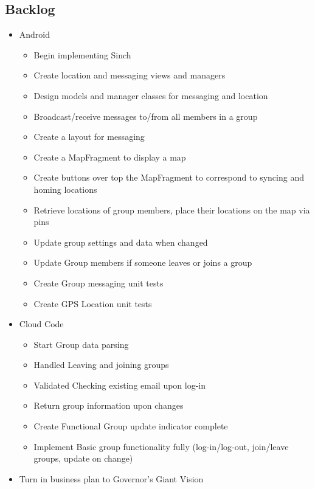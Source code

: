 \subsection{Backlog}
\begin{itemize}
	\item Android
	\begin{itemize}
		\item Begin implementing Sinch
		\item Create location and messaging views and managers
		\item Design models and manager classes for messaging and location
		\item Broadcast/receive messages to/from all members in a group
		\item Create a layout for messaging
		\item Create a MapFragment to display a map
		\item Create buttons over top the MapFragment to correspond to syncing and homing locations
		\item Retrieve locations of group members, place their locations on the map via pins
		\item Update group settings and data when changed
		\item Update Group members if someone leaves or joins a group
		\item Create Group messaging unit tests
		\item Create GPS Location unit tests
	\end{itemize}
	\item Cloud Code
	\begin{itemize}
		\item Start Group data parsing
		\item Handled Leaving and joining groups
		\item Validated Checking existing email upon log-in
		\item Return group information upon changes
		\item Create Functional Group update indicator complete
		\item Implement Basic group functionality fully (log-in/log-out, join/leave groups, update on change)
	\end{itemize}
	\item Turn in business plan to Governor's Giant Vision
\end{itemize}
